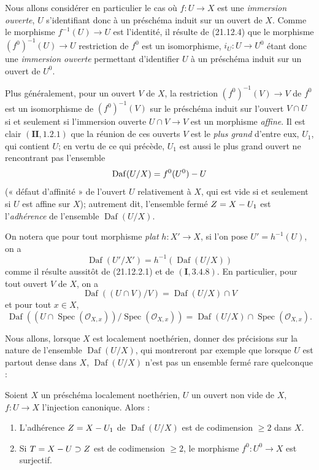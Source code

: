 \begin{env}[21.12.5]
Nous allons considérer en particulier le cas où $f:U\to X$ est une \emph{immersion
ouverte}, $U$ s'identifiant donc à un préschéma induit sur un ouvert de $X$. Comme le
morphisme $f^{-1}(U)\to U$ est l'identité, il résulte de (21.12.4) que le morphisme
$(f^0)^{-1}(U)\to U$ restriction de $f^0$ est un isomorphisme, $i_U:U\to U^0$ étant
donc une \emph{immersion ouverte} permettant d'identifier $U$ à un préschéma induit
sur un ouvert de $U^0$.

Plus généralement, pour un ouvert $V$ de $X$, la restriction $(f^0)^{-1}(V)\to V$ de
$f^0$ est un isomorphisme de $(f^0)^{-1}(V)$ sur le préschéma induit sur l'ouvert
$V\cap U$ si et seulement si l'immersion ouverte $U\cap V\to V$ est un morphisme
\emph{affine}. Il est clair $(\mathbf{II}, 1.2.1)$
que la réunion de ces ouverts $V$ est le \emph{plus grand} d'entre eux, $U_1$, qui
contient $U$; en vertu de ce qui précède, $U_1$ est aussi le plus grand ouvert ne
rencontrant pas l'ensemble
\[
  \operatorname{Daf}(U/X)=f^0(U^0)- U
\]
(« défaut d'affinité » de l'ouvert $U$ relativement à $X$, qui est vide si et seulement
si $U$ est affine sur $X$); autrement dit, l'ensemble fermé $Z=X- U_1$ est
l'\emph{adhérence} de l'ensemble $\operatorname{Daf}(U/X)$.

On notera que pour tout morphisme \emph{plat} $h:X'\to X$, si l'on pose
$U'=h^{-1}(U)$, on a
\[
\label{IV.21.12.5.1}
  \operatorname{Daf}(U'/X')=h^{-1}(\operatorname{Daf}(U/X))
  \tag{21.12.5.1}
\]
comme il résulte aussitôt de (21.12.2.1) et de $(\mathbf I, 3.4.8)$. En particulier,
pour tout ouvert $V$ de $X$, on a
\[
\label{IV.21.12.5.2}
  \operatorname{Daf}((U\cap V)/V)=\operatorname{Daf}(U/X)\cap V
  \tag{21.12.5.2}
\]
et pour tout $x\in X$,
\[
\label{IV.21.12.5.3}
  \operatorname{Daf}((U\cap\operatorname{Spec}(\mathcal O_{X,x}))
  /\operatorname{Spec}(\mathcal O_{X,x}))
  =\operatorname{Daf}(U/X)\cap\operatorname{Spec}(\mathcal O_{X,x}).
  \tag{21.12.5.3}
\]
\end{env}

Nous allons, lorsque $X$ est localement noethérien, donner des précisions sur la nature
de l'ensemble $\operatorname{Daf}(U/X)$, qui montreront par exemple que lorsque $U$ est
partout dense dans $X$, $\operatorname{Daf}(U/X)$ n'est pas un ensemble fermé rare
quelconque :

\begin{theorem}[21.12.6]
\label{IV.21.12.6}
Soient $X$ un préschéma localement noethérien, $U$ un ouvert non vide de $X$,
$f:U\to X$ l'injection canonique. Alors :
\begin{enumerate}[label=\textup{(\roman*)}]
  \item L'adhérence $Z=X- U_1$ de $\operatorname{Daf}(U/X)$ est de codimension
  $\geq2$ dans $X$.
  \item Si $T=X- U\supset Z$ est de codimension $\geq2$, le morphisme
  $f^0:U^0\to X$ est surjectif.
\end{enumerate}
\end{theorem}

